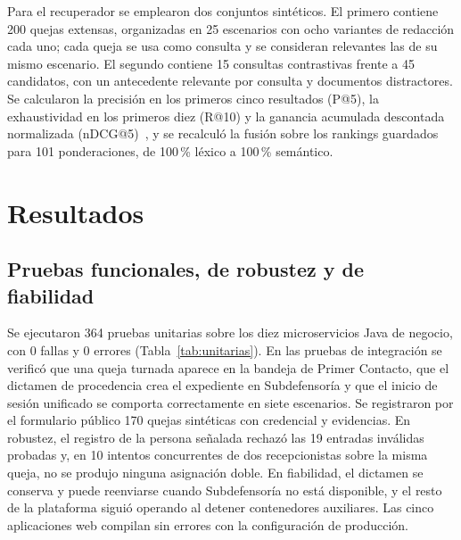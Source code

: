\documentclass[conference,letterpaper]{IEEEtran}
\begin{document}
Para el recuperador se emplearon dos conjuntos sintéticos. El primero contiene 200 quejas extensas, organizadas en 25 escenarios con ocho variantes de redacción cada uno; cada queja se usa como consulta y se consideran relevantes las de su mismo escenario. El segundo contiene 15 consultas contrastivas frente a 45 candidatos, con un antecedente relevante por consulta y documentos distractores. Se calcularon la precisión en los primeros cinco resultados (P@5), la exhaustividad en los primeros diez (R@10) y la ganancia acumulada descontada normalizada (nDCG@5)~\cite{manning}, y se recalculó la fusión sobre los rankings guardados para 101 ponderaciones, de 100\,\% léxico a 100\,\% semántico.

\section{Resultados}

\subsection{Pruebas funcionales, de robustez y de fiabilidad}

Se ejecutaron 364 pruebas unitarias sobre los diez microservicios Java de negocio, con 0 fallas y 0 errores (Tabla~\ref{tab:unitarias}). En las pruebas de integración se verificó que una queja turnada aparece en la bandeja de Primer Contacto, que el dictamen de procedencia crea el expediente en Subdefensoría y que el inicio de sesión unificado se comporta correctamente en siete escenarios. Se registraron por el formulario público 170 quejas sintéticas con credencial y evidencias. En robustez, el registro de la persona señalada rechazó las 19 entradas inválidas probadas y, en 10 intentos concurrentes de dos recepcionistas sobre la misma queja, no se produjo ninguna asignación doble. En fiabilidad, el dictamen se conserva y puede reenviarse cuando Subdefensoría no está disponible, y el resto de la plataforma siguió operando al detener contenedores auxiliares. Las cinco aplicaciones web compilan sin errores con la configuración de producción.
\end{document}
